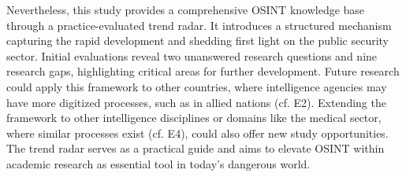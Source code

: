 \documentclass[10pt]{article}
\begin{document}
Nevertheless, this study provides a comprehensive OSINT knowledge base through a practice-evaluated trend radar. It introduces a structured mechanism capturing the rapid development and shedding first light on the public security sector. Initial evaluations reveal two unanswered research questions and nine research gaps, highlighting critical areas for further development. Future research could apply this framework to other countries, where intelligence agencies may have more digitized processes, such as in allied nations (cf. E2). Extending the framework to other intelligence disciplines or domains like the medical sector, where similar processes exist (cf. E4), could also offer new study opportunities. The trend radar serves as a practical guide and aims to elevate OSINT within academic research as essential tool in today’s dangerous world.

\end{document}
